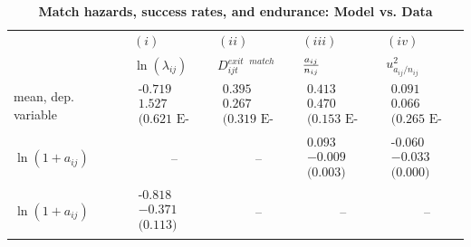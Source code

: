 \documentclass[12pt]{article}
\begin{document}
\begin{table}[tbp]
\caption{\textbf{Match hazards, success rates, and endurance: Model vs. Data}
}
\label{tab:haz_model_data}
{\small \ }
\par
{\small 
\begin{tabular}{lllll}
\hline\hline
& $(i)$ & $(ii)$ & $(iii)$ & $(iv)$ \\ 
& $\ln (\lambda _{ij})$ & $D_{ijt}^{exit\text{ }match}$ & $\frac{a_{ij}}{%
n_{ij}}$ & $u_{a_{ij}/n_{ij}}^{2}$ \\ \hline
mean, dep. variable & $%
\begin{array}{c}
\text{-0.719} \\ 
1.527 \\ 
\text{(0.621 E-2)}%
\end{array}%
$ & $%
\begin{array}{c}
\text{0.395} \\ 
0.267 \\ 
\text{(0.319 E-2)}%
\end{array}%
$ & $%
\begin{array}{c}
\text{0.413} \\ 
0.470 \\ 
\text{(0.153 E-2)}%
\end{array}%
$ & $%
\begin{array}{c}
\text{0.091} \\ 
0.066 \\ 
\text{(0.265 E-3)}%
\end{array}%
$ \\ \cline{2-5}
$\ln (1+a_{ij})$ & \ \ \ \ \ \ -- & \ \ \ \ \ \ -- & $%
\begin{array}{c}
\text{0.093} \\ 
-0.009 \\ 
\text{(0.003)}%
\end{array}%
$ & $%
\begin{array}{c}
\text{-0.060} \\ 
-0.033 \\ 
\text{(0.000)}%
\end{array}%
$ \\ \cline{2-5}
$\ln (1+a_{ij})$ & $%
\begin{array}{c}
\text{-0.818} \\ 
-0.371 \\ 
\text{(0.113)}%
\end{array}%
$ & \ \ \ \ \ \ -- & \ \ \ \ \ \ -- & \ \ \ \ \ \ -- \\ \cline{2-5}

\end{tabular}}
\end{table}
\end{document}
